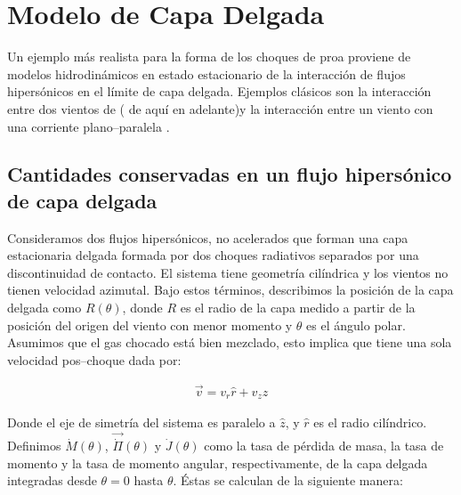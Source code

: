 \chapter{Modelo de Capa Delgada}
\label{chap:hipersonica}

Un ejemplo más realista para la forma de los choques de proa proviene de modelos hidrodinámicos en estado estacionario de la interacción de flujos hipersónicos en el límite de capa delgada. Ejemplos clásicos son la interacción entre dos vientos de \citet{Canto:1996} (\CRW{} de aquí en adelante)y la interacción entre un viento con una corriente plano--paralela \citep{Wilkin:1996}. 
\section{Cantidades conservadas en un flujo hipersónico de capa delgada}

Consideramos dos flujos hipersónicos, no acelerados que forman una capa estacionaria delgada formada por dos choques radiativos separados por una discontinuidad de contacto. El sistema tiene geometría cilíndrica y los vientos no tienen velocidad azimutal. Bajo estos términos, describimos la posición de la capa delgada como $R(\theta)$, donde $R$ es el radio de la capa medido a partir de la posición del origen del viento con menor momento y $\theta$ es el ángulo polar. Asumimos que el gas chocado está bien mezclado, esto implica que  tiene una sola velocidad pos--choque dada por:

\begin{align}
  \vec{v} = v_r \hat{r} + v_z \hat{z}
\end{align}

Donde el eje de simetría del sistema es paralelo a $\hat{z}$, y $\hat{r}$ es el radio cilíndrico. Definimos $\dot{M}(\theta)$, $\vec{\dot{\Pi}}(\theta)$ y $\dot{J}(\theta)$ como la tasa de pérdida de masa, la tasa de momento y la tasa de momento angular, respectivamente, de la capa delgada integradas desde $\theta=0$ hasta $\theta$. Éstas se calculan de la siguiente manera:

